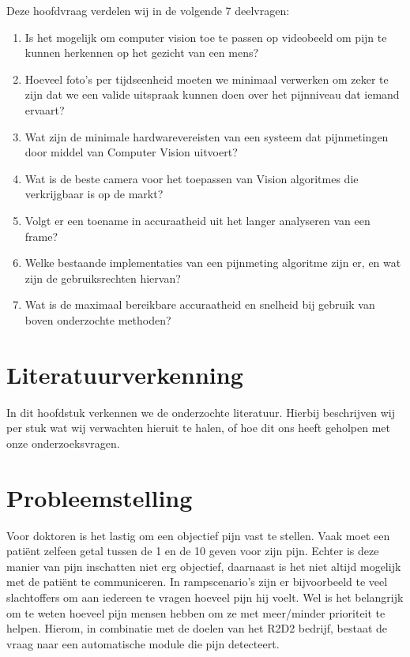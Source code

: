 \documentclass[11pt]{article}
\begin{document}
    Deze hoofdvraag verdelen wij in de volgende 7 deelvragen:

    \begin{enumerate}
        \item Is het mogelijk om computer vision toe te passen op videobeeld om pijn te kunnen herkennen op het gezicht van een mens?
        \item Hoeveel foto’s per tijdseenheid moeten we minimaal verwerken om zeker te zijn dat we een valide uitspraak kunnen doen over het pijnniveau dat iemand ervaart?
        \item Wat zijn de minimale hardwarevereisten van een systeem dat pijnmetingen door middel van Computer Vision uitvoert?
        \item Wat is de beste camera voor het toepassen van Vision algoritmes die verkrijgbaar is op de markt?
        \item Volgt er een toename in accuraatheid uit het langer analyseren van een frame?
        \item Welke bestaande implementaties van een pijnmeting algoritme zijn er, en wat zijn de gebruiksrechten hiervan?
        \item Wat is de maximaal bereikbare accuraatheid en snelheid bij gebruik van boven onderzochte methoden?
    \end{enumerate}


    \section{Literatuurverkenning}
    In dit hoofdstuk verkennen we de onderzochte literatuur.
    Hierbij beschrijven wij per stuk wat wij verwachten hieruit te halen, of hoe dit ons heeft geholpen met onze onderzoeksvragen.


    \section{Probleemstelling}
    Voor doktoren is het lastig om een objectief pijn vast te stellen.
    Vaak moet een patiënt zelfeen getal tussen de 1 en de 10 geven voor zijn pijn.
    Echter is deze manier van pijn inschatten niet erg objectief, daarnaast is het niet
    altijd mogelijk met de patiënt te communiceren.
    In rampscenario’s zijn er bijvoorbeeld te veel slachtoffers om aan iedereen te vragen hoeveel pijn hij voelt.
    Wel is het belangrijk om te weten hoeveel pijn mensen hebben om ze met meer/minder prioriteit te helpen.
    Hierom, in combinatie met de doelen van het R2D2 bedrijf, bestaat de vraag naar een automatische module die pijn
    detecteert.
\end{document}
